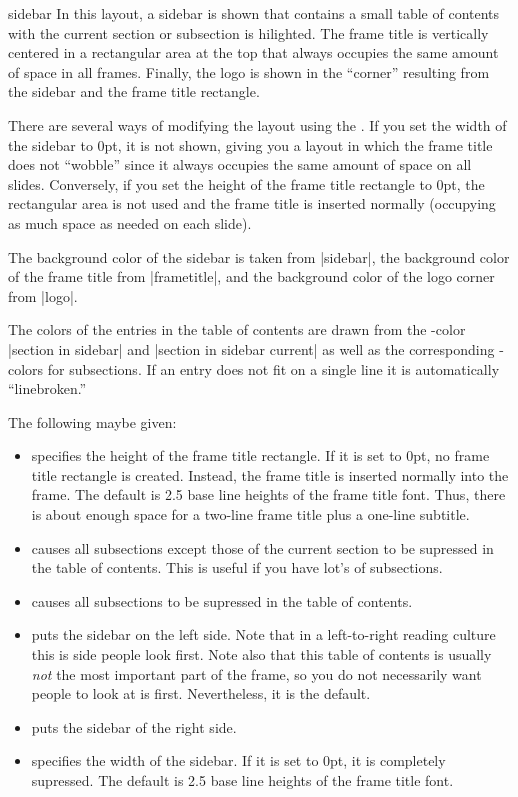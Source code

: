 \begin{layoutthemeexample}{sidebar}
  In this layout, a sidebar is shown that contains a small table of
  contents with the current section or subsection is hilighted. The
  frame title is vertically centered in a rectangular area at the top
  that always occupies the same amount of space in all
  frames. Finally, the logo is shown in the ``corner'' resulting from
  the sidebar and the frame title rectangle.

  There are several ways of modifying the layout using the
  . If you set the width of the sidebar to 0pt, it is
  not shown, giving you a layout in which the frame title does not
  ``wobble'' since it always occupies the same amount of space on all
  slides. Conversely, if you set the height of the frame title
  rectangle to 0pt, the rectangular area is not used and the frame
  title is inserted normally (occupying as much space as needed on
  each slide).

  The background color of the sidebar is taken from |sidebar|, the
  background color of the frame title from |frametitle|, and the
  background color of the logo corner from |logo|.

  The colors of the entries in the table of contents are drawn from
  the \beamer-color |section in sidebar| and |section in sidebar current| as well as the
  corresponding \beamer-colors for subsections. If an entry does not
  fit on a single line it is automatically ``linebroken.'' 

  The following  maybe given:
  \begin{itemize}
  \item
     specifies the height of the
    frame title rectangle. If it is set to 0pt, no frame title
    rectangle is created. Instead, the frame title is inserted
    normally into the frame. The default is 2.5 base line heights of
    the frame title font. Thus, there is about enough space for a
    two-line frame title plus a one-line subtitle.
  \item
     causes all subsections except
    those of the current section to be supressed in the table of
    contents. This is useful if you have lot's of subsections.
  \item
     causes all subsections to be
    supressed in the table of contents.
  \item
     puts the sidebar on the left side. Note that in a
    left-to-right reading culture this is side people look first. Note
    also that this table of contents is usually \emph{not} the most
    important part of the frame, so you do not necessarily want people
    to look at is first. Nevertheless, it is the default.
  \item
     puts the sidebar of the right side.
  \item
     specifies the width of the
    sidebar. If it is set to 0pt, it is completely supressed. The
    default is 2.5 base line heights of the frame title font.
  \end{itemize}
\end{layoutthemeexample}


